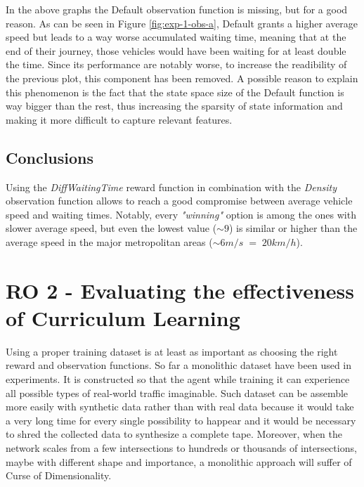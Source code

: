 
In the above graphs the Default observation function is missing, but for a good reason.
As can be seen in Figure \ref{fig:exp-1-obs-a}, Default grants a higher average speed but leads to a way worse accumulated waiting time, meaning that at the end of their journey, those vehicles would have been waiting for at least double the time.
Since its performance are notably worse, to increase the readibility of the previous plot, this component has been removed.
A possible reason to explain this phenomenon is the fact that the state space size of the Default function is way bigger than the rest, thus increasing the sparsity of state information and making it more difficult to capture relevant features.


\subsection{Conclusions}

Using the \textit{DiffWaitingTime} reward function in combination with the \textit{Density} observation function allows to reach a good compromise between average vehicle speed and waiting times.
Notably, every \textit{"winning"} option is among the ones with slower average speed, but even the lowest value ($\sim9$) is similar or higher than the average speed in the major metropolitan areas ($\sim 6 m/s \; = \; 20 km/h$).

\section{RO 2 - Evaluating the effectiveness of Curriculum Learning}

Using a proper training dataset is at least as important as choosing the right reward and observation functions.
So far a monolithic dataset have been used in experiments.
It is constructed so that the agent while training it can experience all possible types of real-world traffic imaginable.
Such dataset can be assemble more easily with synthetic data rather than with real data because it would take a very long time for every single possibility to happear and it would be necessary to shred the collected data to synthesize a complete tape.
Moreover, when the network scales from a few intersections to hundreds or thousands of intersections, maybe with different shape and importance, a monolithic approach will suffer of Curse of Dimensionality.


